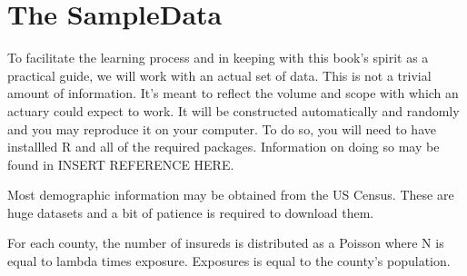 \chapter{The SampleData}
To facilitate the learning process and in keeping with this book's spirit as a practical guide, we will work with an actual set of data. This is not a trivial amount of information. It's meant to reflect the volume and scope with which an actuary could expect to work. It will be constructed automatically and randomly and you may reproduce it on your computer. To do so, you will need to have installled R and all of the required packages. Information on doing so may be found in INSERT REFERENCE HERE.

Most demographic information may be obtained from the US Census. These are huge datasets and a bit of patience is required to download them.

For each county, the number of insureds is distributed as a Poisson where N is equal to lambda times exposure. Exposures is equal to the county's population.